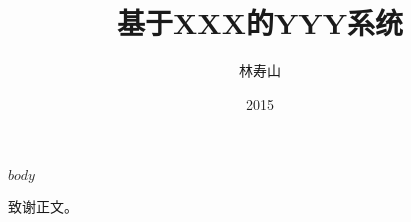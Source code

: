 \documentclass[format=draft,language=chinese,degree=bachelor]{hustthesis}
\title{基于XXX的YYY系统}{A YYY System based on XXX}
\author
{林寿山}{Lin Shoushan}
\date{2015}{12}{12}
\begin{document}
\frontmatter
\maketitle
\makeabstract
\tableofcontents
\listoffigures
\listoftables
\mainmatter

$body$

\backmatter

\begin{ack}
致谢正文。
\end{ack}


\end{document}
